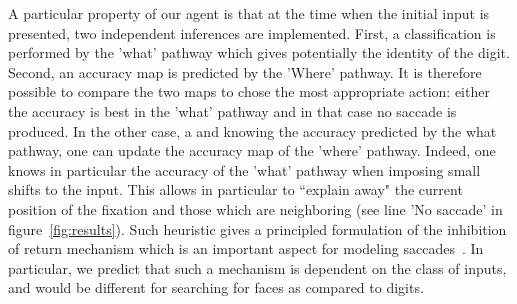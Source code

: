 

A particular property of our agent is that at the time when the initial input is presented, two independent inferences are implemented. First, a classification is performed by the 'what' pathway which gives potentially the identity of the digit. Second, an accuracy map is predicted by the 'Where' pathway. It is therefore possible to compare the two maps to chose the most appropriate action: either the  accuracy is best in the 'what' pathway and in that case no saccade is produced. In the other case, a and knowing the accuracy predicted by the what pathway, one can update the accuracy map of the 'where' pathway. Indeed, one knows in particular the accuracy of the 'what' pathway when imposing small shifts to the input. This allows in particular to ``explain away" the current position of the fixation and those which are neighboring (see line 'No saccade' in figure~\ref{fig:results}). Such heuristic gives a principled formulation of the inhibition of return mechanism which is an important aspect for modeling saccades~\citep{Itti01}. In particular, we predict that such a mechanism is dependent on the class of inputs, and would be different for searching for faces as compared to digits.
